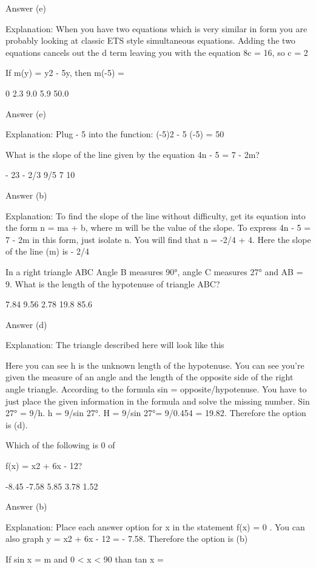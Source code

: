 Answer (e)

Explanation: When you have two equations which is very similar in form you are probably looking at classic ETS style simultaneous equations. Adding the two equations cancels out the d term leaving you with the equation 8c = 16, so c = 2

If m(y) = y2 - 5y, then m(-5) =

    0
    2.3
    9.0
    5.9
    50.0 

Answer (e)

Explanation: Plug - 5 into the function: (-5)2 - 5 (-5) = 50

What is the slope of the line given by the equation 4n - 5 = 7 - 2m?

    - 23
    - 2/3
    9/5
    7
    10 

Answer (b)

Explanation: To find the slope of the line without difficulty, get its equation into the form n = ma + b, where m will be the value of the slope. To express 4n - 5 = 7 - 2m in this form, just isolate n. You will find that n = -2/4 + 4. Here the slope of the line (m) is - 2/4

In a right triangle ABC Angle B measures 90°, angle C measures 27° and AB = 9. What is the length of the hypotenuse of triangle ABC?

    7.84
    9.56
    2.78
    19.8
    85.6 

Answer (d)

Explanation: The triangle described here will look like this

Here you can see h is the unknown length of the hypotenuse. You can see you're given the measure of an angle and the length of the opposite side of the right angle triangle. According to the formula sin = opposite/hypotenuse. You have to just place the given information in the formula and solve the missing number. Sin 27° = 9/h. h = 9/sin 27°. H = 9/sin 27°= 9/0.454 = 19.82. Therefore the option is (d).

Which of the following is 0 of

f(x) = x2 + 6x - 12?

    -8.45
    -7.58
    5.85
    3.78
    1.52 

Answer (b)

Explanation: Place each answer option for x in the statement f(x) = 0 . You can also graph y = x2 + 6x - 12 = - 7.58. Therefore the option is (b)

If sin x = m and 0 < x < 90 than tan x =

